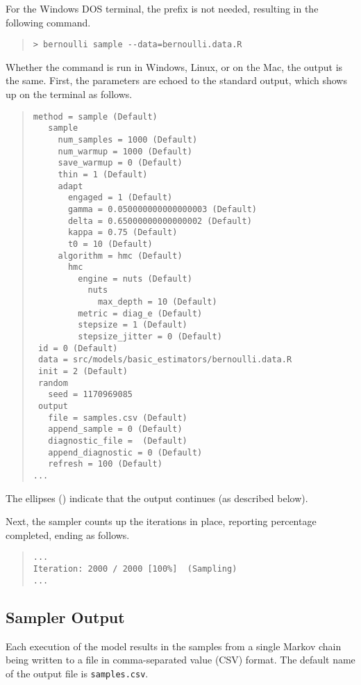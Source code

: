 For the Windows DOS terminal, the  prefix is not needed,
resulting in the following command.
%
\begin{quote}
\begin{Verbatim}[fontshape=sl,fontsize=\small]
> bernoulli sample --data=bernoulli.data.R
\end{Verbatim}
\end{quote}
%
Whether the command is run in Windows, Linux, or on the Mac, the
output is the same.  First, the parameters are echoed to the standard output,
which shows up on the terminal as follows.
%
\begin{quote}
\begin{Verbatim}[fontsize=\small]
 method = sample (Default)
   sample
     num_samples = 1000 (Default)
     num_warmup = 1000 (Default)
     save_warmup = 0 (Default)
     thin = 1 (Default)
     adapt
       engaged = 1 (Default)
       gamma = 0.050000000000000003 (Default)
       delta = 0.65000000000000002 (Default)
       kappa = 0.75 (Default)
       t0 = 10 (Default)
     algorithm = hmc (Default)
       hmc
         engine = nuts (Default)
           nuts
             max_depth = 10 (Default)
         metric = diag_e (Default)
         stepsize = 1 (Default)
         stepsize_jitter = 0 (Default)
 id = 0 (Default)
 data = src/models/basic_estimators/bernoulli.data.R
 init = 2 (Default)
 random
   seed = 1170969085
 output
   file = samples.csv (Default)
   append_sample = 0 (Default)
   diagnostic_file =  (Default)
   append_diagnostic = 0 (Default)
   refresh = 100 (Default)
...
\end{Verbatim}
\end{quote}
%
The ellipses () indicate that the output continues (as
described below).

Next, the sampler counts up the iterations in place, reporting
percentage completed, ending as follows.
%
\begin{quote}
\begin{Verbatim}[fontsize=\small]
...
Iteration: 2000 / 2000 [100%]  (Sampling)
...
\end{Verbatim}
\end{quote}

\subsection{Sampler Output}

Each execution of the model results in the samples from a single
Markov chain being written to a file in comma-separated value (CSV) format.
The default name of the output file is \nolinkurl{samples.csv}.


